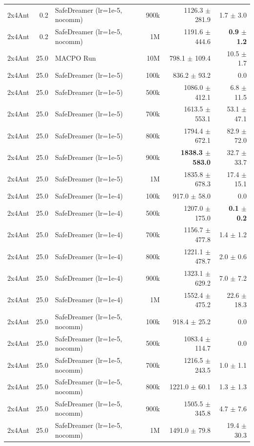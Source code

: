 \documentclass{article}
\begin{document}
\begin{longtable}{l r l r r r}
2x4Ant & 0.2 & SafeDreamer (lr=1e-5, nocomm) & 900k & 1126.3 $\pm$ 281.9 & 1.7 $\pm$ 3.0 \\
2x4Ant & 0.2 & SafeDreamer (lr=1e-5, nocomm) & 1M & 1191.6 $\pm$ 444.6 & \textbf{0.9 $\pm$ 1.2} \\
\midrule
2x4Ant & 25.0 & MACPO Run & 10M & 798.1 $\pm$ 109.4 & 10.5 $\pm$ 1.7 \\
2x4Ant & 25.0 & SafeDreamer (lr=1e-5) & 100k & 836.2 $\pm$ 93.2 & 0.0 \\
2x4Ant & 25.0 & SafeDreamer (lr=1e-5) & 500k & 1086.0 $\pm$ 412.1 & 6.8 $\pm$ 11.5 \\
2x4Ant & 25.0 & SafeDreamer (lr=1e-5) & 700k & 1613.5 $\pm$ 553.1 & 53.1 $\pm$ 47.1 \\
2x4Ant & 25.0 & SafeDreamer (lr=1e-5) & 800k & 1794.4 $\pm$ 672.1 & 82.9 $\pm$ 72.0 \\
2x4Ant & 25.0 & SafeDreamer (lr=1e-5) & 900k & \textbf{1838.3 $\pm$ 583.0} & 32.7 $\pm$ 33.7 \\
2x4Ant & 25.0 & SafeDreamer (lr=1e-5) & 1M & 1835.8 $\pm$ 678.3 & 17.4 $\pm$ 15.1 \\
2x4Ant & 25.0 & SafeDreamer (lr=1e-4) & 100k & 917.0 $\pm$ 58.0 & 0.0 \\
2x4Ant & 25.0 & SafeDreamer (lr=1e-4) & 500k & 1207.0 $\pm$ 175.0 & \textbf{0.1 $\pm$ 0.2} \\
2x4Ant & 25.0 & SafeDreamer (lr=1e-4) & 700k & 1156.7 $\pm$ 477.8 & 1.4 $\pm$ 1.2 \\
2x4Ant & 25.0 & SafeDreamer (lr=1e-4) & 800k & 1221.1 $\pm$ 478.7 & 2.0 $\pm$ 0.6 \\
2x4Ant & 25.0 & SafeDreamer (lr=1e-4) & 900k & 1323.1 $\pm$ 629.2 & 7.0 $\pm$ 7.2 \\
2x4Ant & 25.0 & SafeDreamer (lr=1e-4) & 1M & 1552.4 $\pm$ 475.2 & 22.6 $\pm$ 18.3 \\
2x4Ant & 25.0 & SafeDreamer (lr=1e-5, nocomm) & 100k & 918.4 $\pm$ 25.2 & 0.0 \\
2x4Ant & 25.0 & SafeDreamer (lr=1e-5, nocomm) & 500k & 1083.4 $\pm$ 114.7 & 0.0 \\
2x4Ant & 25.0 & SafeDreamer (lr=1e-5, nocomm) & 700k & 1216.5 $\pm$ 243.5 & 1.0 $\pm$ 1.1 \\
2x4Ant & 25.0 & SafeDreamer (lr=1e-5, nocomm) & 800k & 1221.0 $\pm$ 60.1 & 1.3 $\pm$ 1.3 \\
2x4Ant & 25.0 & SafeDreamer (lr=1e-5, nocomm) & 900k & 1505.5 $\pm$ 345.8 & 4.7 $\pm$ 7.6 \\
2x4Ant & 25.0 & SafeDreamer (lr=1e-5, nocomm) & 1M & 1491.0 $\pm$ 79.8 & 19.4 $\pm$ 30.3 \\

\end{longtable}
\end{document}
